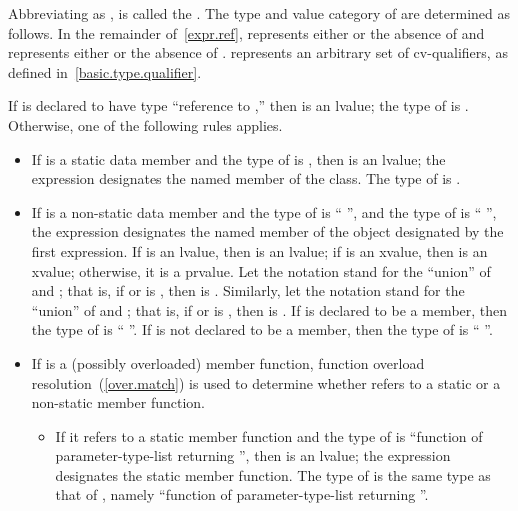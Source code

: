 \pnum
Abbreviating 
as ,
 is called the . The
type and value category of  are determined as follows.
In the remainder of~\ref{expr.ref},  represents either
 or the absence of  and  represents
either  or the absence of . 
represents an arbitrary set of cv-qualifiers, as defined
in~\ref{basic.type.qualifier}.

\pnum
If  is declared to have type ``reference to ,'' then
 is an lvalue; the type of  is .
Otherwise, one of the following rules applies.

\begin{itemize}
\item If  is a static data member and the type of 
is , then  is an lvalue; the expression designates
the named member of the class. The type of  is .

\item If  is a non-static data member and the type of
 is `` '', and the type of 
is `` '', the expression designates the named
member of the object designated by the first expression. If 
is an lvalue, then  is an lvalue;
if  is an xvalue, then  is an xvalue;
otherwise, it is a prvalue. Let the notation  stand for the ``union'' of
 and ; that is, if  or 
is , then  is . Similarly,
let the notation  stand for the ``union'' of 
and ; that is, if  or  is
, then  is . If  is
declared to be a  member, then the type of 
is `` ''. If  is not declared to be a
 member, then the type of  is
``  ''.

\item If  is a (possibly overloaded) member function, function
overload resolution~(\ref{over.match}) is used to determine whether
 refers to a static or a non-static member function.

\begin{itemize}
\item If it refers to a static member function and the type of
 is ``function of parameter-type-list returning '',
then  is an lvalue; the expression designates the static
member function. The type of  is the same type as that of
, namely ``function of parameter-type-list returning
''.


\end{itemize}
\end{itemize}
